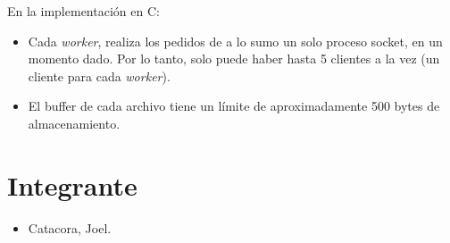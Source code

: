 \documentclass[a4paper, 8pt]{article}
\begin{document}
En la implementación en C:

\begin{itemize}
  \item Cada \textit{worker}, realiza los pedidos de a lo sumo un solo proceso socket, en un momento dado. Por lo tanto, solo puede haber
  hasta 5 clientes a la vez (un cliente para cada \textit{worker}).
  
  \item El buffer de cada archivo tiene un límite de aproximadamente 500 bytes de almacenamiento.
  
\end{itemize}

\section{Integrante}
\begin{itemize}
  \item Catacora, Joel.
\end{itemize}
\end{document}
